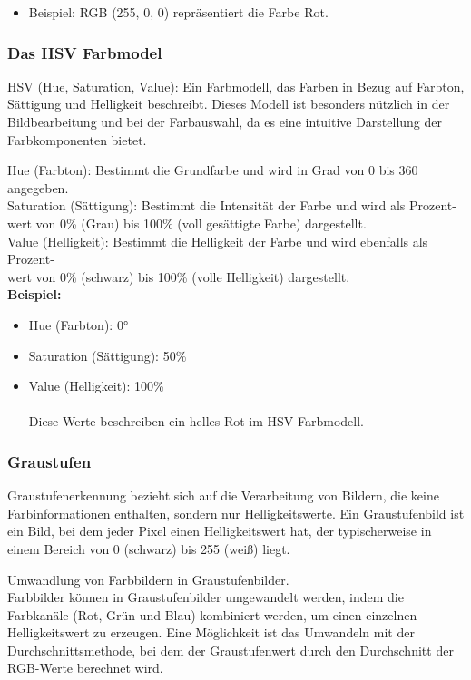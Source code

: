 \begin{itemize}
    \item Beispiel: RGB (255, 0, 0) repräsentiert die Farbe Rot.
\end{itemize}



\subsubsection{Das HSV Farbmodel}
{HSV (Hue, Saturation, Value): Ein Farbmodell, das Farben in Bezug auf Farbton, Sättigung und Helligkeit beschreibt. Dieses Modell ist besonders nützlich in der Bildbearbeitung und bei der Farbauswahl, da es eine intuitive Darstellung der Farbkomponenten bietet.
    
    Hue (Farbton): Bestimmt die Grundfarbe und wird in Grad von 0 bis 360 angegeben.\\
    
    Saturation (Sättigung): Bestimmt die Intensität der Farbe und wird als Prozent-\\wert von 0\% (Grau) bis 100\% (voll gesättigte Farbe) dargestellt.\\
    
    Value (Helligkeit): Bestimmt die Helligkeit der Farbe und wird ebenfalls als Prozent-\\wert von 0\% (schwarz) bis 100\% (volle Helligkeit) dargestellt. \cite{Hasche:2016}
    \\
    \textbf{Beispiel:}
}

\begin{itemize}
    \item Hue (Farbton): 0°
    \item Saturation (Sättigung): 50\%
    \item Value (Helligkeit): 100\%  \\
    \\
    Diese Werte beschreiben ein helles Rot im HSV-Farbmodell.
\end{itemize}

\subsubsection{Graustufen}
{Graustufenerkennung bezieht sich auf die Verarbeitung von Bildern, die keine Farbinformationen enthalten, sondern nur Helligkeitswerte. Ein Graustufenbild ist ein Bild, bei dem jeder Pixel einen Helligkeitswert hat, der typischerweise in einem Bereich von 0 (schwarz) bis 255 (weiß) liegt.
    
    Umwandlung von Farbbildern in Graustufenbilder.\\
    
    Farbbilder können in Graustufenbilder umgewandelt werden, indem die Farbkanäle (Rot, Grün und Blau) kombiniert werden, um einen einzelnen Helligkeitswert zu erzeugen. 
    Eine Möglichkeit ist das Umwandeln mit der Durchschnittsmethode, bei dem der  Graustufenwert durch den Durchschnitt der RGB-Werte berechnet wird.
}

